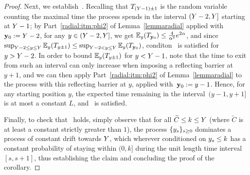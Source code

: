 \begin{proof}
Next, we establish~. Recalling that $T_{(Y-1)\pm 1}$ is the random variable counting the maximal time the process spends in the interval $(Y-2,Y]$ starting at $Y-1$; by Part~\eqref{radial:itm:phi2} of Lemma~\ref{lemmaradial} applied with ${\bf y}_0:=Y-2$, for any $y \in (Y-2,Y]$, we get $\mathbb{E}_{y}(T_{{\bf y}_0}) \le \frac{4}{\alpha^2}e^{2\alpha}$, and since $\sup_{Y-2 \le y \le Y} \mathbb{E}_y (T_{y \pm 1}) \le \sup_{Y-2 < y \le Y} \mathbb{E}_{y}(T_{{\bf y}_0})$, conditon~ is satisfied for $y > Y-2$. In order to bound $\mathbb{E}_y(T_{y\pm 1})$ for $y<Y-1$, note that the time to exit from such an interval can only increase when imposing a reflecting barrier at $y+1$, and we can then apply  Part~\eqref{radial:itm:phi2} of Lemma~\ref{lemmaradial} to the process with this reflecting barrier at $y$, applied with~${\bf y}_0:=y-1$. Hence, for any starting position $y$, the expected time remaining in the interval~$(y-1,y+1]$ is at most a constant $L$, and~ is satisfied.


Finally, to check that~ holds, simply observe that 
for all $\widetilde{C}\le k\le Y$ (where $\widetilde{C}$ is at least a constant strictly greater than $1$), the process $\{y_s\}_{s\ge 0}$ dominates a process of constant drift towards $Y$, which wherever conditioned on $y_s\le k$ has a constant probability of staying within $(0,k]$ during the unit length time interval $[s,s+1]$, thus establishing the claim and concluding the proof of the corollary.
\end{proof}
